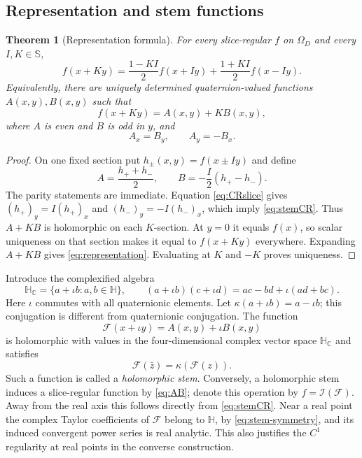 \documentclass[11pt,a4paper]{article}
\numberwithin{equation}{section}
\newtheorem{theorem}{Theorem}[section]
\theoremstyle{definition}
\theoremstyle{remark}
\newcommand{\C}{\mathbb C}
\newcommand{\HH}{\mathbb H}
\newcommand{\SSS}{\mathbb S}
\newcommand{\cI}{\mathcal I}
\begin{document}
\subsection{Representation and stem functions}
\begin{theorem}[Representation formula]
\label{thm:representation}
For every slice-regular $f$ on $\Omega_D$ and every $I,K\in\SSS$,
\begin{equation}
 f(x+Ky)=\frac{1-KI}{2}f(x+Iy)+\frac{1+KI}{2}f(x-Iy).
 \label{eq:representation}
\end{equation}
Equivalently, there are uniquely determined quaternion-valued functions
$A(x,y),B(x,y)$ such that
\begin{equation}
 f(x+Ky)=A(x,y)+KB(x,y),
 \label{eq:AB}
\end{equation}
where $A$ is even and $B$ is odd in $y$, and
\begin{equation}
 A_x=B_y,\qquad A_y=-B_x.
 \label{eq:stemCR}
\end{equation}
\end{theorem}
\begin{proof}
On one fixed section put $h_\pm(x,y)=f(x\pm Iy)$ and define
\[
 A=\frac{h_++h_-}{2},\qquad B=-\frac I2(h_+-h_-).
\]
The parity statements are immediate. Equation \eqref{eq:CRslice} gives
$(h_+)_y=I(h_+)_x$ and $(h_-)_y=-I(h_-)_x$, which imply
\eqref{eq:stemCR}. Thus $A+KB$ is holomorphic on each $K$-section.
At $y=0$ it equals $f(x)$, so scalar uniqueness on that section makes it equal
to $f(x+Ky)$ everywhere. Expanding $A+KB$ gives
\eqref{eq:representation}. Evaluating at $K$ and $-K$ proves uniqueness.
\end{proof}

Introduce the complexified algebra
\[
 \HH_{\C}=\{a+\iota b:a,b\in\HH\},\qquad
 (a+\iota b)(c+\iota d)=ac-bd+\iota(ad+bc).
\]
Here $\iota$ commutes with all quaternionic elements. Let
$\kappa(a+\iota b)=a-\iota b$; this conjugation is different from quaternionic
conjugation. The function
\[
 \mathcal F(x+\iota y)=A(x,y)+\iota B(x,y)
\]
is holomorphic with values in the four-dimensional complex vector space
$\HH_{\C}$ and satisfies
\begin{equation}
 \mathcal F(\bar z)=\kappa(\mathcal F(z)).
 \label{eq:stem-symmetry}
\end{equation}
Such a function is called a \emph{holomorphic stem}. Conversely, a holomorphic
stem induces a slice-regular function by \eqref{eq:AB}; denote this operation by
$f=\cI(\mathcal F)$. Away from the real axis this follows directly from
\eqref{eq:stemCR}. Near a real point the complex Taylor coefficients of
$\mathcal F$ belong to $\HH$, by \eqref{eq:stem-symmetry}, and its induced
convergent power series is real analytic. This also justifies the $C^1$
regularity at real points in the converse construction.
\end{document}
